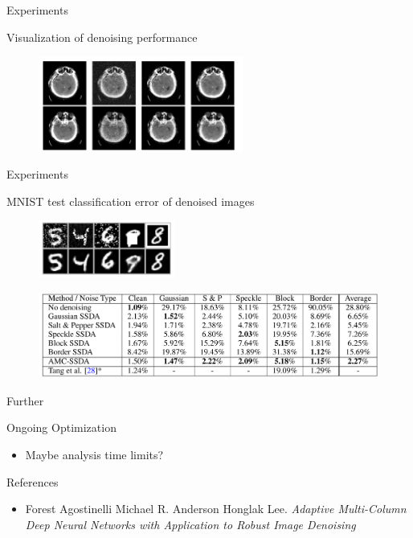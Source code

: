 \documentclass[notes]{beamer}
\begin{document}
\begin{frame}{Experiments}
	\begin{block}{Visualization of denoising performance}
		\begin{figure}
			\includegraphics[width=0.6\textwidth]{3.png}
		\end{figure}
	\end{block}
\end{frame}

\begin{frame}{Experiments}
	\begin{block}{MNIST test classification error of denoised images}
		\begin{figure}
			\includegraphics[width=0.4\textwidth]{4.png}
		\end{figure}
		\begin{figure}
			\includegraphics[width=1.0\textwidth]{5.png}
		\end{figure}
	\end{block}
\end{frame}

\begin{frame}{Further}
	\begin{block}{Ongoing Optimization}
		\begin{itemize}
			\item Maybe analysis time limits?
		\end{itemize}
	\end{block}
\end{frame}


\begin{frame}{References}
	\begin{itemize}
		\item Forest Agostinelli Michael R. Anderson Honglak Lee. \textit{Adaptive Multi-Column Deep Neural Networks
with Application to Robust Image Denoising}
	
	\end{itemize}
\end{frame}
\end{document}
